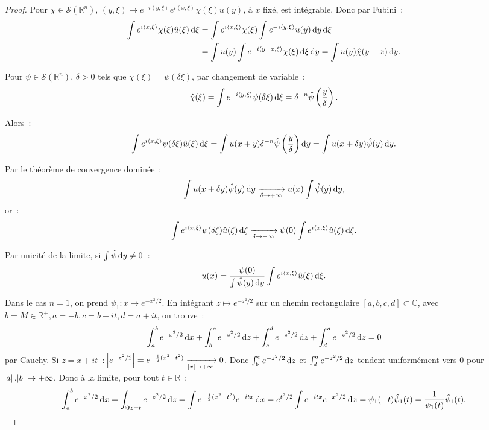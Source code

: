 \documentclass{report}
\newcommand{\C}{{\mathbb C}}
\newcommand{\R}{{\mathbb R}}
\newcommand{\scpr}[2]{\left\langle#1, #2\right\rangle}
\newcommand{\pinfty}{{+\infty}}
\newcommand{\dx}{\dif x}
\theoremstyle{definition}
\theoremstyle{remark}
\begin{document}
\begin{proof} Pour $\chi \in \mathcal S(\R^n)$, $(y, \xi) \mapsto e^{-i\scpr y\xi}e^{i\scpr x\xi}\chi(\xi)u(y)$, à $x$ fixé, est intégrable. Donc par Fubini~:
\begin{align*}
	\int e^{i\scpr x\xi}\chi(\xi)\hat u(\xi)\dif\xi &= \int e^{i\scpr x\xi}\chi(\xi)\int e^{-i\scpr y\xi}u(y)\dif y\dif\xi \\
	&= \int u(y)\int e^{-i\scpr {y-x}\xi}\chi(\xi)\dif\xi \dif y = \int u(y)\hat \chi(y-x)\dif y.
\end{align*}

Pour $\psi \in \mathcal S(\R^n)$, $\delta > 0$ tels que $\chi(\xi) = \psi(\delta\xi)$, par changement de variable~:
\[\hat \chi(\xi) = \int e^{-i\scpr y\xi}\psi(\delta\xi)\dif\xi = \delta^{-n}\hat \psi\left(\frac y\delta\right).\]

Alors~:
\[\int e^{i\scpr x\xi}\psi(\delta\xi)\hat u(\xi)\dif\xi = \int u(x+y)\delta^{-n}\hat \psi\left(\frac y\delta\right)\dif y = \int u(x+\delta y)\hat \psi(y)\dif y.\]

Par le théorème de convergence dominée~:
\[\int u(x+\delta y)\hat \psi(y)\dif y \xrightarrow[\delta \to \pinfty]{} u(x)\int \hat \psi(y)\dif y,\]
or~:
\[\int e^{i\scpr x\xi}\psi(\delta \xi)\hat u(\xi)\dif\xi \xrightarrow[\delta \to \pinfty]{} \psi(0)\int e^{i\scpr x\xi}\hat u(\xi)\dif\xi.\]

Par unicité de la limite, si $\int \hat \psi \dif y\neq 0$~:
\begin{equation}\label{eq:inversion Fourier proof}
	u(x) = \frac {\psi(0)}{\int\hat \psi(y)\dif y}\int e^{i\scpr x\xi}\hat u(\xi)\dif\xi.
\end{equation}

Dans le cas $n=1$, on prend $\psi_1 : x \mapsto e^{-x^2/2}$. En intégrant $z \mapsto e^{-z^2/2}$ sur un chemin rectangulaire $[a,b,c,d] \subset \C$,
avec $b = M \in \R^+, a=-b, c = b+it, d = a+it$, on trouve~:
\[\int_a^b e^{-x^2/2}\dx + \int_b^c e^{-z^2/2}\dif z + \int_c^d e^{-z^2/2}\dif z + \int_d^a e^{-z^2/2}\dif z = 0\]
par Cauchy. Si $z = x+it$~: $\abs {e^{-z^2/2}} = e^{-\frac 12(x^2-t^2)} \xrightarrow[\abs x \to \pinfty]{} 0$. Donc $\int_b^c e^{-z^2/2}\dif z$ et $\int_d^a e^{-z^2/2}\dif z$
tendent uniformément vers $0$ pour $\abs a, \abs b \to \pinfty$. Donc à la limite, pour tout $t \in \R$~:
\[\int_a^b e^{-x^2/2}\dx = \int_{\Im z = t}e^{-z^2/2}\dif z = \int e^{-\frac 12(x^2-t^2)}e^{-itx}\dx = e^{t^2/2}\int e^{-itx}e^{-x^2/2}\dif x = \psi_1(-t)\hat\psi_1(t)
	= \frac 1{\psi_1(t)}\hat\psi_1(t).\]


\end{proof}
\end{document}
